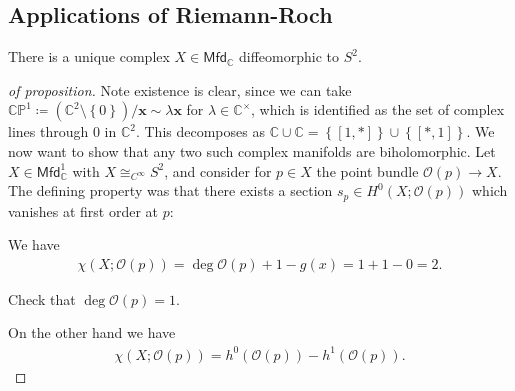 \hypertarget{applications-of-riemann-roch-1}{%
\subsection{Applications of
Riemann-Roch}\label{applications-of-riemann-roch-1}}

\begin{proposition}[?]

There is a unique complex \(X\in {\mathsf{Mfd}}_{\mathbb{C}}\)
diffeomorphic to \(S^2\).

\end{proposition}

\begin{proof}[of proposition]

Note existence is clear, since we can take
\({\mathbb{CP}}^1 \coloneqq({\mathbb{C}}^2 \setminus\left\{{0}\right\}) / \mathbf{x} \sim \lambda\mathbf{x}\)
for \(\lambda\in {\mathbb{C}}^{\times}\), which is identified as the set
of complex lines through \(0\) in \({\mathbb{C}}^2\). This decomposes as
\({\mathbb{C}}\cup{\mathbb{C}}= \left\{{ [1, *] }\right\} \cup\left\{{ [*, 1] }\right\}\).
We now want to show that any two such complex manifolds are
biholomorphic. Let \(X \in {\mathsf{Mfd}}_{\mathbb{C}}^1\) with
\(X\cong_{C^{\infty }} S^2\), and consider for \(p\in X\) the point
bundle \({\mathcal{O}}(p) \to X\). The defining property was that there
exists a section \(s_p \in H^0(X; {\mathcal{O}}(p) )\) which vanishes at
first order at \(p\):

\begin{figure}
\centering
{}
\end{figure}

We have
\begin{align*}
\chi(X; {\mathcal{O}}(p)) 
= \deg {\mathcal{O}}(p) + 1 - g(x) = 1 + 1 - 0 = 2
.\end{align*}

\begin{exercise}[?]

Check that \(\deg {\mathcal{O}}(p) = 1\).

\end{exercise}

On the other hand we have
\begin{align*}
\chi(X; {\mathcal{O}}(p)) 
=
h^0({\mathcal{O}}(p)) - h^1( {\mathcal{O}}(p) )
.\end{align*}


\end{proof}
